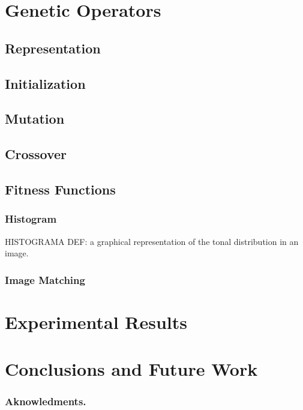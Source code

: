 \documentclass[conference]{IEEEtran}
\begin{document}
\section{Genetic Operators}\label{go}
\subsection{Representation}\label{go:repre}
\subsection{Initialization}\label{go:init}
\subsection{Mutation}\label{go:mutation}
\subsection{Crossover}\label{go:crossover}
\subsection{Fitness Functions}\label{go:fitness}
\subsubsection{Histogram}\label{go:fitness:hist}
HISTOGRAMA DEF: a graphical representation of the tonal distribution in an image.
\subsubsection{Image Matching}\label{go:fitness:image_match}

\section{Experimental Results} \label{exper}

\section{Conclusions and Future Work}\label{conclusions}

\subsubsection*{Aknowledments.} 



\end{document}
